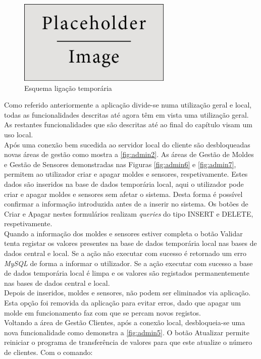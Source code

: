 \documentclass[11pt,twoside,a4paper]{report}
\begin{document}
\begin{figure}[H]
	\begin{center}
		\includegraphics[width=0.65\textwidth]{placeholder} %
		\caption{Esquema ligação temporária}
		\label{fig:admin3}
	\end{center}
\end{figure}
Como referido anteriormente a aplicação divide-se numa utilização geral e local, todas as funcionalidades descritas até agora têm em vista uma utilização geral. As restantes funcionalidades que são descritas até ao final do capítulo visam um uso local.\\
Após uma conexão bem sucedida ao servidor local do cliente são desbloqueadas novas áreas de gestão como mostra a \autoref{fig:admin2}. As áreas de Gestão de Moldes e Gestão de Sensores demonstradas nas Figuras \ref{fig:admin6} e \ref{fig:admin7}, permitem ao utilizador criar e apagar moldes e sensores, respetivamente. Estes dados são inseridos na base de dados temporária local, aqui o utilizador pode criar e apagar moldes e sensores sem afetar o sistema. Desta forma é possível confirmar a informação introduzida antes de a inserir no sistema. Os botões de Criar e Apagar nestes formulários realizam \textit{queries} do tipo INSERT e DELETE, respetivamente.\\
Quando a informação dos moldes e sensores estiver completa o botão Validar tenta registar os valores presentes na base de dados temporária local nas bases de dados central e local. Se a ação não executar com sucesso é retornado um erro \textit{MySQL} de forma a informar o utilizador. Se a ação executar com sucesso a base de dados temporária local é limpa e os valores são registados permanentemente nas bases de dados central e local.\\
Depois de inseridos, moldes e sensores, não podem ser eliminados via aplicação. Esta opção foi removida da aplicação para evitar erros, dado que apagar um molde em funcionamento faz com que se percam novos registos.\\
Voltando a área de Gestão Clientes, após a conexão local, desbloqueia-se uma nova funcionalidade como demonstra a \autoref{fig:admin5}. O botão Atualizar permite reiniciar o programa de transferência de valores para que este atualize o número de clientes. Com o comando:\\
\end{document}
